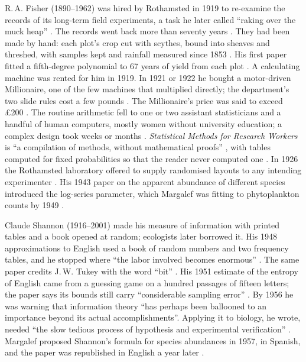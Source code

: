 R.\,A. Fisher (1890--1962) was hired by Rothamsted in 1919 to re-examine the
records of its long-term field experiments, a task he later called ``raking
over the muck heap'' \parencite{yates1963fishermemoir}. The records went back
more than seventy years \parencite{fisher1921cropvariation}. They had been made
by hand: each plot's crop cut with scythes, bound into sheaves and threshed,
with samples kept and rainfall measured since 1853
\parencite{rothamsted2006guide}. His first paper fitted a fifth-degree
polynomial to 67 years of yield from each plot
\parencite{fisher1921cropvariation}. A calculating machine was rented for him
in 1919. In 1921 or 1922 he bought a motor-driven Millionaire, one of the few
machines that multiplied directly; the department's two slide rules cost a few
pounds \parencite{parolini2015rothamsted}. The Millionaire's price was said to
exceed \pounds200 \parencite{gower2015rothamstedcomputing}. The routine
arithmetic fell to one or two assistant statisticians and a handful of human
computers, mostly women without university education; a complex design took
weeks or months \parencite{parolini2015rothamsted}. \emph{Statistical Methods
for Research Workers} is ``a compilation of methods, without mathematical
proofs'' \parencite{yates1963fishermemoir}, with tables computed for fixed
probabilities so that the reader never computed one
\parencite{parolini2015rothamsted}. In 1926 the Rothamsted laboratory offered
to supply randomised layouts to any intending experimenter
\parencite{fisher1926arrangement}. His 1943 paper on the apparent abundance of
different species \parencite{yates1963fishermemoir} introduced the log-series
parameter, which Margalef was fitting to phytoplankton counts by 1949
\parencite{sherwin2019margalef}.

Claude Shannon (1916--2001) made his measure of information with printed
tables and a book opened at random; ecologists later borrowed it. His 1948
approximations to English used a book of random numbers and two frequency tables, and
he stopped where ``the labor involved becomes enormous''
\parencite{shannon1948communication}. The same paper credits J.\,W. Tukey with
the word ``bit'' \parencite{shannon1948communication}. His 1951 estimate of the
entropy of English came from a guessing game on a hundred passages of fifteen
letters; the paper says its bounds still carry ``considerable sampling error''
\parencite{shannon1951entropy}. By 1956 he was warning that information theory
``has perhaps been ballooned to an importance beyond its actual
accomplishments''. Applying it to biology, he wrote, needed ``the slow tedious
process of hypothesis and experimental verification''
\parencite{shannon1956bandwagon}. Margalef proposed Shannon's formula for
species abundances in 1957, in Spanish, and the paper was republished in
English a year later \parencite{sherwin2019margalef}.

